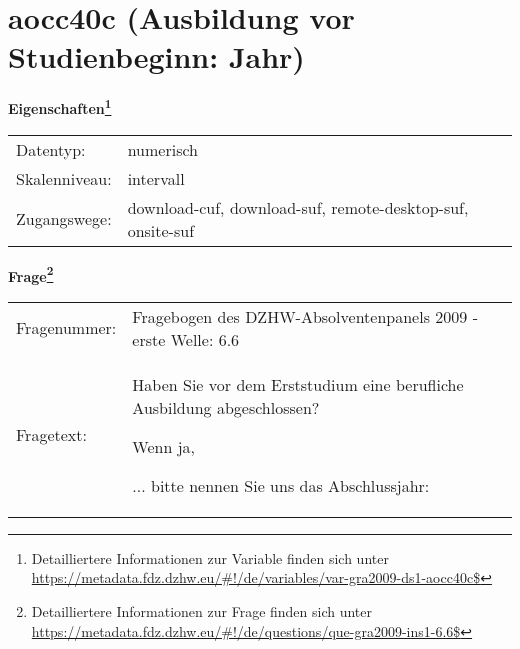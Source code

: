 
    \setcounter{footnote}{0}

    \vspace*{-1.8cm}
	\section{aocc40c (Ausbildung vor Studienbeginn: Jahr)}
	\label{section:aocc40c}



    \vspace*{0.5cm}
    \noindent\textbf{Eigenschaften\footnote{Detailliertere Informationen zur Variable finden sich unter
		\url{https://metadata.fdz.dzhw.eu/\#!/de/variables/var-gra2009-ds1-aocc40c$}}}\\
	\begin{tabularx}{\hsize}{@{}lX}
	Datentyp: & numerisch \\
	Skalenniveau: & intervall \\
	Zugangswege: &
	  download-cuf, 
	  download-suf, 
	  remote-desktop-suf, 
	  onsite-suf
 \\
    \end{tabularx}



				\vspace*{0.5cm}
                \noindent\textbf{Frage\footnote{Detailliertere Informationen zur Frage finden sich unter
		              \url{https://metadata.fdz.dzhw.eu/\#!/de/questions/que-gra2009-ins1-6.6$}}}\\
				\begin{tabularx}{\hsize}{@{}lX}
					Fragenummer: &
					  Fragebogen des DZHW-Absolventenpanels 2009 - erste Welle:
					  6.6
 \\
					Fragetext: & Haben Sie vor dem Erststudium eine berufliche Ausbildung abgeschlossen?\par  Wenn ja,\par  ... bitte nennen Sie uns das Abschlussjahr: \\
				\end{tabularx}





